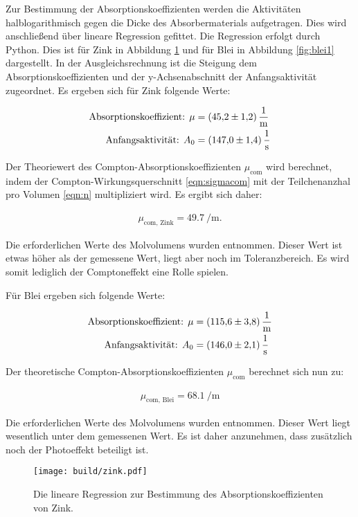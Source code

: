 Zur Bestimmung der Absorptionskoeffizienten werden die Aktivitäten halblogarithmisch gegen die Dicke des Absorbermaterials aufgetragen.
Dies wird anschließend über lineare Regression gefittet.
Die Regression erfolgt durch Python.
Dies ist für Zink in Abbildung \ref{fig:zink1} und für Blei in Abbildung \ref{fig:blei1} dargestellt.
In der Ausgleichsrechnung ist die Steigung dem Absorptionskoeffizienten und der y-Achsenabschnitt der Anfangsaktivität zugeordnet.
Es ergeben sich für Zink folgende Werte:

\begin{align*}
  \text{Absorptionskoeffizient: } \mu &= \SI{45.2 \pm 1.2}{\per\metre} \\
  \text{Anfangsaktivität: } A_0 &= \SI{147.0 \pm 1.4}{\per\second}
\end{align*}

Der Theoriewert des Compton-Absorptionskoeffizienten $\mu_\text{com}$ wird berechnet, indem der Compton-Wirkungsquerschnitt \ref{eqn:sigmacom} mit der Teilchenanzhal pro Volumen \ref{eqn:n} multipliziert wird.
Es ergibt sich daher:

\begin{align*}
  \mu_\text{com, Zink} = \SI{49.7}{\per\metre}.
\end{align*}

Die erforderlichen Werte des Molvolumens wurden \cite{zink} entnommen.
Dieser Wert ist etwas höher als der gemessene Wert, liegt aber noch im Toleranzbereich.
Es wird somit lediglich der Comptoneffekt eine Rolle spielen.

Für Blei ergeben sich folgende Werte:

\begin{align*}
  \text{Absorptionskoeffizient: } \mu &= \SI{115.6 \pm 3.8}{\per\metre} \\
  \text{Anfangsaktivität: } A_0 &= \SI{146.0 \pm 2.1}{\per\second}
\end{align*}

Der theoretische Compton-Absorptionskoeffizienten $\mu_\text{com}$ berechnet sich nun zu:

\begin{align*}
  \mu_\text{com, Blei} = \SI{68.1}{\per\metre}
\end{align*}

Die erforderlichen Werte des Molvolumens wurden \cite{blei} entnommen.
Dieser Wert liegt wesentlich unter dem gemessenen Wert.
Es ist daher anzunehmen, dass zusätzlich noch der Photoeffekt beteiligt ist.

\begin{figure}
  \centering
  \texttt{[image: build/zink.pdf]}
  \caption{Die lineare Regression zur Bestimmung des Absorptionskoeffizienten von Zink.}
  \label{fig:zink1}
\end{figure}

